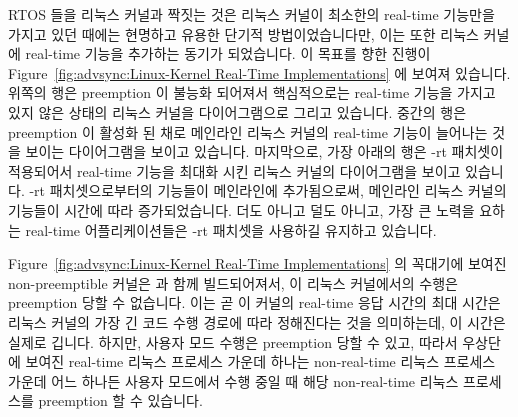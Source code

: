 RTOS 들을 리눅스 커널과 짝짓는 것은 리눅스 커널이 최소한의 real-time 기능만을
가지고 있던 때에는 현명하고 유용한 단기적 방법이었습니다만, 이는 또한 리눅스
커널에 real-time 기능을 추가하는 동기가 되었습니다.
이 목표를 향한 진행이
Figure~\ref{fig:advsync:Linux-Kernel Real-Time Implementations} 에 보여져
있습니다.
위쪽의 행은 preemption 이 불능화 되어져서 핵심적으로는 real-time 기능을 가지고
있지 않은 상태의 리눅스 커널을 다이어그램으로 그리고 있습니다.
중간의 행은 preemption 이 활성화 된 채로 메인라인 리눅스 커널의 real-time
기능이 늘어나는 것을 보이는 다이어그램을 보이고 있습니다.
마지막으로, 가장 아래의 행은 -rt 패치셋이 적용되어서 real-time 기능을 최대화
시킨 리눅스 커널의 다이어그램을 보이고 있습니다.
-rt 패치셋으로부터의 기능들이 메인라인에 추가됨으로써, 메인라인 리눅스 커널의
기능들이 시간에 따라 증가되었습니다.
더도 아니고 덜도 아니고, 가장 큰 노력을 요하는 real-time 어플리케이션들은 -rt
패치셋을 사용하길 유지하고 있습니다.

Figure~\ref{fig:advsync:Linux-Kernel Real-Time Implementations} 의 꼭대기에
보여진 non-preemptible 커널은  과 함께 빌드되어져서, 이
리눅스 커널에서의 수행은 preemption 당할 수 없습니다.
이는 곧 이 커널의 real-time 응답 시간의 최대 시간은 리눅스 커널의 가장 긴 코드
수행 경로에 따라 정해진다는 것을 의미하는데, 이 시간은 실제로 깁니다.
하지만, 사용자 모드 수행은 preemption 당할 수 있고, 따라서 우상단에 보여진
real-time 리눅스 프로세스 가운데 하나는 non-real-time 리눅스 프로세스 가운데
어느 하나든 사용자 모드에서 수행 중일 때 해당 non-real-time 리눅스 프로세스를
preemption 할 수 있습니다.
\iffalse

